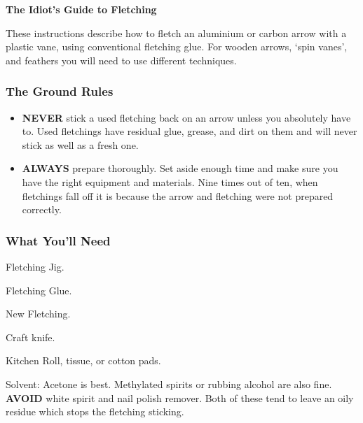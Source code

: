 \documentclass[12pt]{article}
\begin{document}
\begin{center}
	\large{\textbf{The Idiot's Guide to Fletching}}
\end{center}

These instructions describe how to fletch an aluminium or carbon arrow with a plastic vane, using conventional fletching glue. For wooden arrows, `spin vanes', and feathers you will need to use different techniques.

\subsubsection*{The Ground Rules}

\begin{itemize}
	\item {\bf NEVER} stick a used fletching back on an arrow unless you absolutely have to. Used fletchings have residual glue, grease, and dirt on them and will never stick as well as a fresh one.
	\item {\bf ALWAYS} prepare thoroughly. Set aside enough time and make sure you have the right equipment and materials. Nine times out of ten, when fletchings fall off it is because the arrow and fletching were not prepared correctly.
\end{itemize}

\subsubsection*{What You'll Need}
\begin{compactitem}
	\item Fletching Jig.
	\item Fletching Glue.
	\item New Fletching.
	\item Craft knife.
	\item Kitchen Roll, tissue, or cotton pads.
	\item Solvent: Acetone is best. Methylated spirits or rubbing alcohol are also fine. {\bf AVOID} white spirit and nail polish remover. Both of these tend to leave an oily residue which stops the fletching sticking.
\end{compactitem}
\end{document}
